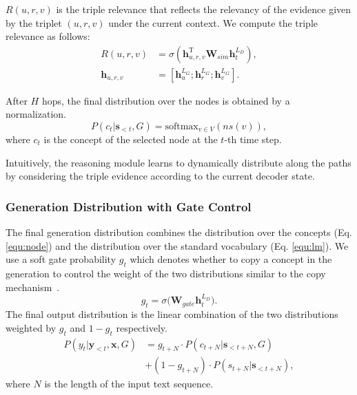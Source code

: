 \documentclass[11pt,a4paper]{article}
\begin{document}
$R(u,r,v)$ is the triple relevance that reflects the relevancy of the evidence given by the triplet $(u, r, v)$ under the current context. We compute the triple relevance as follows:
\begin{align}
    R(u,r,v)&=\sigma(\bm{h}_{u,r,v}^\mathrm{T}\mathbf{W}_{sim} \bm{h}_t^{L_D}),\\
    \bm{h}_{u,r,v} &= [\bm{h}_u^{L_G}; \bm{h}_r^{L_G}; \bm{h}_v^{L_G}].
\end{align}

After $H$ hops, the final distribution over the nodes is obtained by a normalization.
\begin{equation}\label{equ:node}
    P(c_t|\bm{s}_{<t}, G)=\text{softmax}_{v\in V}(ns(v)),
\end{equation}
where $c_t$ is the concept of the selected node at the $t$-th time step. 

Intuitively, the reasoning module learns to dynamically distribute along the paths by considering the triple evidence according to the current decoder state.

\subsubsection{Generation Distribution with Gate Control}\label{sec:gate}
The final generation distribution combines the distribution over the concepts (Eq. \ref{equ:node}) and the distribution over the standard vocabulary (Eq. \ref{equ:lm}). We use a soft gate probability $g_t$ which denotes whether to copy a concept in the generation to control the weight of the two distributions similar to the copy mechanism~\citep{Gu2016IncorporatingCM,See2017GetTT}.
\begin{equation}
    g_t = \sigma\Big(\mathbf{W}_{gate}\bm{h}_t^{L_D}\Big).
\end{equation}
The final output distribution is the linear combination of the two distributions weighted by $g_t$ and $1-g_t$ respectively. %
\begin{align}
    P(y_t|\bm{y}_{<t},\bm{x}, G) &= g_{t+N} \cdot P(c_{t+N}|\bm{s}_{<t+N}, G) \nonumber \\ 
    &+ (1-g_{t+N}) \cdot P(s_{t+N}|\bm{s}_{<t+N}),
\end{align}
where $N$ is the length of the input text sequence.
\end{document}
